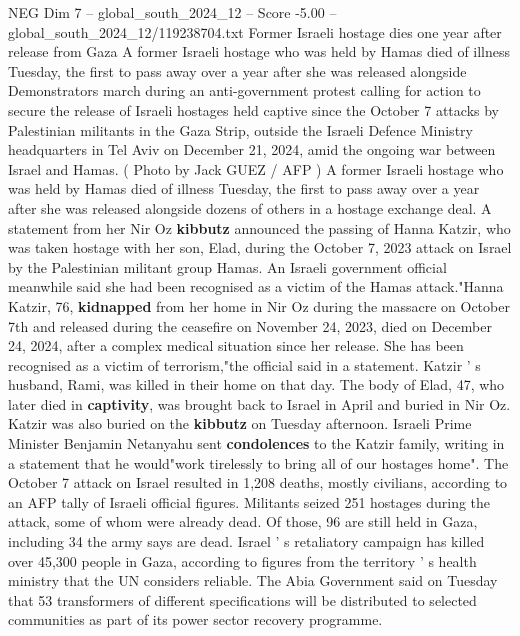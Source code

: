 \begin{textsample}{NEG Dim 7 – global\_south\_2024\_12 – Score -5.00 – global\_south\_2024\_12/119238704.txt}  \label{ex:f7_neg_295}
Former Israeli hostage dies one year after release from Gaza A former Israeli hostage who was held by Hamas died of illness Tuesday, the first to pass away over a year after she was released alongside Demonstrators march during an anti-government protest calling for action to secure the release of Israeli hostages held captive since the October 7 attacks by Palestinian militants in the Gaza Strip, outside the Israeli Defence Ministry headquarters in Tel Aviv on December 21, 2024, amid the ongoing war between Israel and Hamas. ( Photo by Jack GUEZ / AFP ) A former Israeli hostage who was held by Hamas died of illness Tuesday, the first to pass away over a year after she was released alongside dozens of others in a hostage exchange deal.
A statement from her Nir Oz \textbf{kibbutz} announced the passing of Hanna Katzir, who was taken hostage with her son, Elad, during the October 7, 2023 attack on Israel by the Palestinian militant group Hamas.
An Israeli government official meanwhile said she had been recognised as a victim of the Hamas attack."Hanna Katzir, 76, \textbf{kidnapped} from her home in Nir Oz during the massacre on October 7th and released during the ceasefire on November 24, 2023, died on December 24, 2024, after a complex medical situation since her release.
She has been recognised as a victim of terrorism,"the official said in a statement.
Katzir ' s husband, Rami, was killed in their home on that day.
The body of Elad, 47, who later died in \textbf{captivity}, was brought back to Israel in April and buried in Nir Oz.
Katzir was also buried on the \textbf{kibbutz} on Tuesday afternoon.
Israeli Prime Minister Benjamin Netanyahu sent \textbf{condolences} to the Katzir family, writing in a statement that he would"work tirelessly to bring all of our hostages home".
The October 7 attack on Israel resulted in 1,208 deaths, mostly civilians, according to an AFP tally of Israeli official figures.
Militants seized 251 hostages during the attack, some of whom were already dead.
Of those, 96 are still held in Gaza, including 34 the army says are dead.
Israel ' s retaliatory campaign has killed over 45,300 people in Gaza, according to figures from the territory ' s health ministry that the UN considers reliable.
The Abia Government said on Tuesday that 53 transformers of different specifications will be distributed to selected communities as part of its power sector recovery programme.

\end{textsample}
